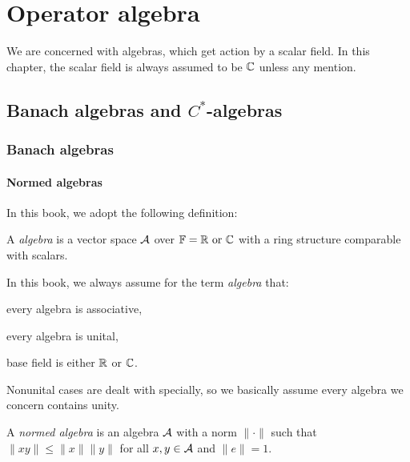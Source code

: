 \documentclass{../crs}
\begin{document}
\chapter{Operator algebra}
We are concerned with algebras, which get action by a scalar field.
In this chapter, the scalar field is always assumed to be $\mathbb{C}$ unless any mention.

\section{Banach algebras and $C^*$-algebras}

\subsection{Banach algebras}

\subsubsection{Normed algebras}
In this book, we adopt the following definition:
\begin{defn}
A \emph{algebra} is a vector space $\mathcal{A}$ over $\mathbb{F}=\mathbb{R}\text{ or }\mathbb{C}$ with a ring structure comparable with scalars.
\end{defn}
In this book, we always assume for the term \emph{algebra} that:
\begin{cond}
\item every algebra is associative,
\item every algebra is unital,
\item base field is either $\mathbb{R}$ or $\mathbb{C}$.
\end{cond}
Nonunital cases are dealt with specially, so we basically assume every algebra we concern contains unity.




\begin{defn}
A \emph{normed algebra} is an algebra $\mathcal{A}$ with a norm $\|\cdot\|$ such that $\|xy\|\le\|x\|\|y\|$ for all $x,y\in\mathcal{A}$ and $\|e\|=1$.
\end{defn}
\end{document}
